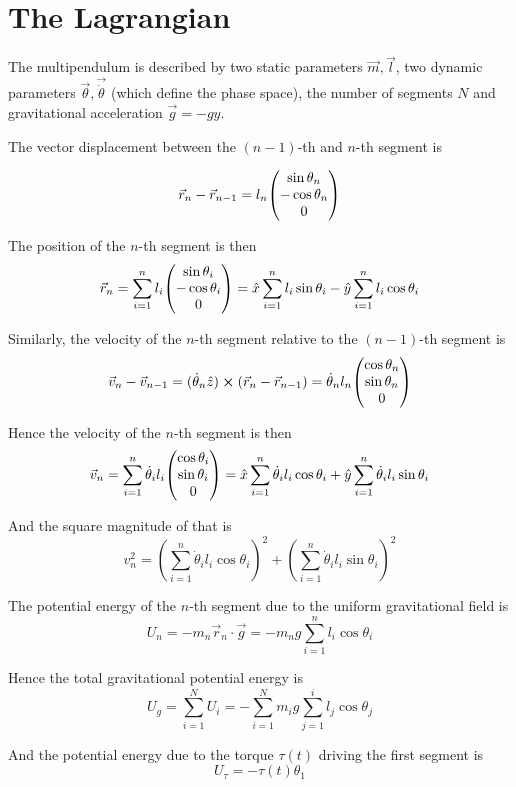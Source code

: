 \documentclass[12pt]{article}
\begin{document}
	\section{The Lagrangian}

	The multipendulum is described by two static parameters $\vec{m}, \vec{l}$, two dynamic parameters $\vec{\theta},\vec{\dot{\theta}}$ (which define the phase space), the number of segments $N$ and gravitational acceleration $\vec{g}=-g\hat{y}$.
	
	The vector displacement between the $(n-1)$-th and $n$-th segment is
	
	$$\vec{r}_n-\vec{r}_{n-1}=l_n\mqty(\sin{\theta_n} \\ -\cos{\theta_n} \\ 0)$$
	
	The position of the $n$-th segment is then
	$$\vec{r}_n=\sum_{i=1}^n l_i\mqty(\sin{\theta_i} \\ -\cos{\theta_i} \\ 0)=\hat{x}\sum_{i=1}^n l_i \sin{\theta_i}-\hat{y}\sum_{i=1}^n l_i \cos{\theta_i}$$
	
	Similarly, the velocity of the $n$-th segment relative to the $(n-1)$-th segment is
	$$\vec{v}_n-\vec{v}_{n-1}=(\dot{\theta}_n\hat{z})\cross (\vec{r}_n-\vec{r}_{n-1})=\dot{\theta}_n l_n \mqty(\cos{\theta_n} \\ \sin{\theta_n} \\ 0)$$
	
	Hence the velocity of the $n$-th segment is then
	$$\vec{v}_n=\sum_{i=1}^n \dot{\theta}_i l_i \mqty(\cos{\theta_i} \\ \sin{\theta_i} \\ 0) = \hat{x}\sum_{i=1}^n \dot{\theta}_i l_i \cos{\theta_i}+\hat{y}\sum_{i=1}^n \dot{\theta}_i l_i \sin{\theta_i}$$
	
	And the square magnitude of that is
	$$v_n^2=\left(\sum_{i=1}^n \dot{\theta}_i l_i \cos{\theta_i}\right)^2+\left(\sum_{i=1}^n \dot{\theta}_i l_i \sin{\theta_i}\right)^2$$
	
	The potential energy of the $n$-th segment due to the uniform gravitational field is
	$$U_n=-m_n\vec{r}_n\cdot\vec{g}=-m_ng\sum_{i=1}^n l_i \cos{\theta_i}$$
	
	Hence the total gravitational potential energy is
	$$U_g=\sum_{i=1}^N U_i=-\sum_{i=1}^N m_ig\sum_{j=1}^i l_j \cos{\theta_j}$$
	
	And the potential energy due to the torque $\tau(t)$ driving the first segment is
	$$U_\tau = -\tau(t)\theta_1$$
	
\end{document}
